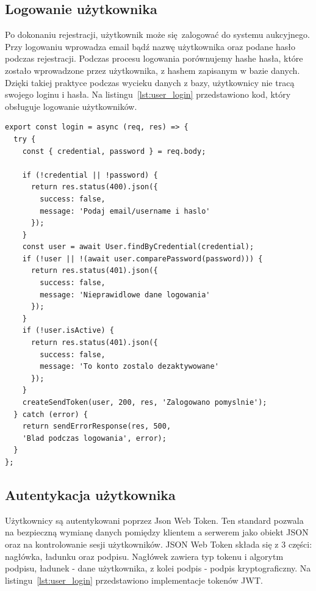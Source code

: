 \subsection{Logowanie użytkownika}
Po dokonaniu rejestracji, użytkownik może się zalogować do systemu aukcyjnego. Przy logowaniu wprowadza email bądź nazwę użytkownika oraz podane hasło podczas rejestracji.
Podczas procesu logowania porównujemy hashe hasła, które zostało wprowadzone przez użytkownika, z hashem zapisanym w bazie danych. Dzięki takiej praktyce podczas wycieku danych z bazy, użytkownicy nie tracą swojego loginu i hasła. Na listingu~\ref{lst:user_login} przedstawiono kod, który obsługuje logowanie użytkowników.

\begin{lstlisting}[style=javascript, caption = {Implementacja procesu logowania użytkownika}, label = {lst:user_login}]
export const login = async (req, res) => {
  try {
    const { credential, password } = req.body;

    if (!credential || !password) {
      return res.status(400).json({
        success: false,
        message: 'Podaj email/username i haslo'
      });
    }
    const user = await User.findByCredential(credential);
    if (!user || !(await user.comparePassword(password))) {
      return res.status(401).json({
        success: false,
        message: 'Nieprawidlowe dane logowania'
      });
    }
    if (!user.isActive) {
      return res.status(401).json({
        success: false,
        message: 'To konto zostalo dezaktywowane'
      });
    }
    createSendToken(user, 200, res, 'Zalogowano pomyslnie');
  } catch (error) {
    return sendErrorResponse(res, 500, 
    'Blad podczas logowania', error);
  }
};
\end{lstlisting}

\subsection{Autentykacja użytkownika}
Użytkownicy są autentykowani poprzez Json Web Token. Ten standard pozwala na bezpieczną wymianę danych pomiędzy klientem a serwerem jako obiekt JSON oraz na kontrolowanie sesji użytkowników.  JSON Web Token składa się z 3 części: nagłówka, ładunku oraz podpisu. Nagłówek zawiera typ tokenu i algorytm podpisu, ładunek - dane użytkownika, z kolei podpis - podpis kryptograficzny. Na listingu~\ref{lst:user_login} przedstawiono implementacje tokenów JWT.

